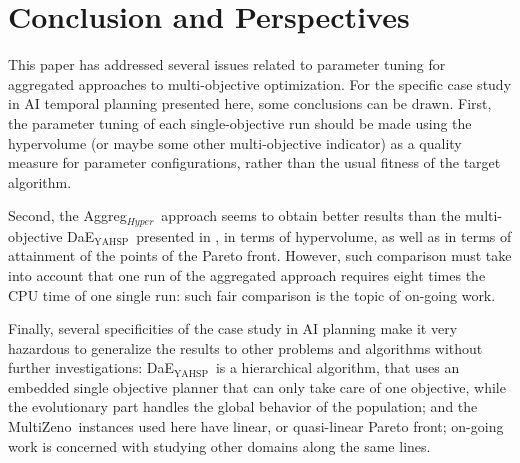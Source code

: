 \documentclass{llncs}
\newcommand{\DAEYAHSP}{{\sc DaE$_{\text{YAHSP}}$}}
\def\MULTIZENO{{\sc MultiZeno}}
\def\AGGREGHYPER{{Aggreg$_{Hyper}$}}
\begin{document}

 
\section{Conclusion and Perspectives}
\label{sec:conclusion}
This paper has addressed several issues related to parameter tuning for aggregated approaches to multi-objective optimization. For the specific case study in AI temporal planning presented here, some conclusions can be drawn.
First, the parameter tuning of each single-objective run should be made using the hypervolume (or maybe some other multi-objective indicator) as a quality measure for parameter configurations, rather than the usual fitness of the target algorithm. 

Second, the \AGGREGHYPER\ approach seems to obtain better results than the multi-objective \DAEYAHSP\ presented in \cite{emo2013}, in terms of hypervolume, as well as in terms of attainment of the points of the Pareto front. However, such comparison must take into account that one run of the aggregated approach requires eight times the CPU time of one single run: such fair comparison is the topic of on-going work.

Finally, several specificities of the case study in AI planning make it very hazardous to generalize the results to other problems and algorithms without further investigations: \DAEYAHSP\ is a hierarchical algorithm, that uses an embedded single objective planner that can only take care of one objective, while the evolutionary part handles the global behavior of the population; and the \MULTIZENO\ instances used here have linear, or quasi-linear Pareto front; on-going work is concerned with studying other domains along the same lines.
\end{document}
